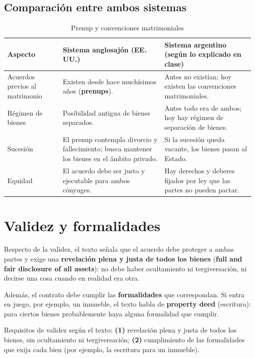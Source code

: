 \documentclass[12pt,oneside]{book}
\begin{document}
\subsection{Comparación entre ambos sistemas}

\begin{table}[H]
\centering
\caption{Prenup y convenciones matrimoniales}
\begin{tabularx}{\textwidth}{@{}>{\raggedright\arraybackslash}p{}YY@{}}
\toprule
\textbf{Aspecto} & \textbf{Sistema anglosajón (EE.\,UU.)} & \textbf{Sistema argentino (según lo explicado en clase)} \\
\midrule
Acuerdos previos al matrimonio & Existen desde hace muchísimos años (\textbf{prenups}). & Antes no existían; hoy existen las convenciones matrimoniales. \\
Régimen de bienes & Posibilidad antigua de bienes separados. & Antes todo era de ambos; hoy hay régimen de separación de bienes. \\
Sucesión & El prenup contempla divorcio y fallecimiento; busca mantener los bienes en el ámbito privado. & Si la sucesión queda vacante, los bienes pasan al Estado. \\
Equidad & El acuerdo debe ser justo y ejecutable para ambos cónyuges. & Hay derechos y deberes fijados por ley que las partes no pueden pactar. \\
\bottomrule
\end{tabularx}
\end{table}

\section{Validez y formalidades}

Respecto de la validez, el texto señala que el acuerdo debe proteger a ambas partes y exige una \textbf{revelación plena y justa de todos los bienes} (\textbf{full and fair disclosure of all assets}): no debe haber ocultamiento ni tergiversación, ni decirse una cosa cuando en realidad era otra.

Además, el contrato debe cumplir las \textbf{formalidades} que correspondan. Si entra en juego, por ejemplo, un inmueble, el texto habla de \textbf{property deed} (escritura): para ciertos bienes probablemente haya alguna formalidad que cumplir.

\begin{important}
Requisitos de validez según el texto: \textbf{(1)} revelación plena y justa de todos los bienes, sin ocultamiento ni tergiversación; \textbf{(2)} cumplimiento de las formalidades que exija cada bien (por ejemplo, la escritura para un inmueble).
\end{important}
\end{document}
